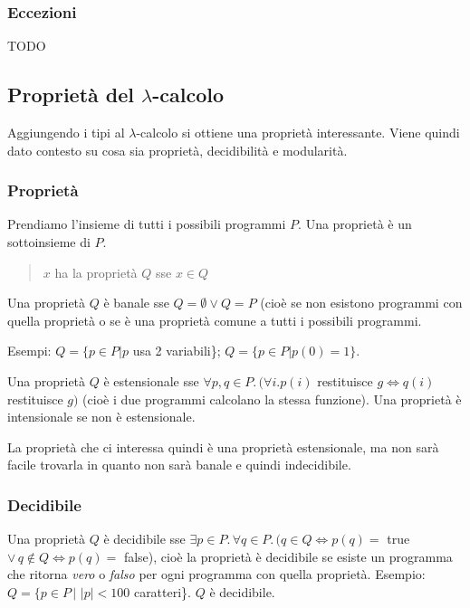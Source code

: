 \documentclass{article}
\begin{document}
\subsubsection{Eccezioni}
TODO

\subsection{Proprietà del $\lambda$-calcolo}
Aggiungendo i tipi al $\lambda$-calcolo si ottiene una proprietà interessante. Viene quindi dato contesto su cosa sia proprietà, decidibilità e modularità.

\subsubsection{Proprietà}
Prendiamo l'insieme di tutti i possibili programmi $P$. Una {\color{red}proprietà} è un sottoinsieme di $P$.

\begin{quote}
    {\color{red}$x$ ha la proprietà $Q$} sse $x \in Q$
\end{quote}

Una proprietà $Q$ è {\color{red}banale} sse $Q = \emptyset \lor Q = P$ (cioè se non esistono programmi con quella proprietà o se è una proprietà comune a tutti i possibili programmi.

\bigskip

Esempi: $Q = \{p \in P | p$ usa 2 variabili\}; $Q = \{p \in P | p(0) = 1\}$.

\bigskip

Una proprietà $Q$ è {\color{red}estensionale} sse $\forall p,q \in P.\,(\forall i. p(i)$ restituisce $g\iff q (i)$ restituisce $g)$ (cioè i due programmi calcolano la stessa funzione). Una proprietà è {\color{red}intensionale} se non è estensionale.

\bigskip

La proprietà che ci interessa quindi è una proprietà estensionale, ma non sarà facile trovarla in quanto non sarà banale e quindi indecidibile.

\subsubsection{Decidibile}
Una proprietà $Q$ è {\color{red}decidibile} sse $\exists p\in P.\,\forall q\in P.\,(q\in Q\iff p(q)=$ true $\lor\,q \not\in Q\iff p(q)=$ false), cioè la proprietà è decidibile se esiste un programma che ritorna \textit{vero} o \textit{falso} per ogni programma con quella proprietà. Esempio: $Q = \{p \in P\,| \,\,|p| < 100$ caratteri\}. $Q$ è decidibile.
\end{document}
